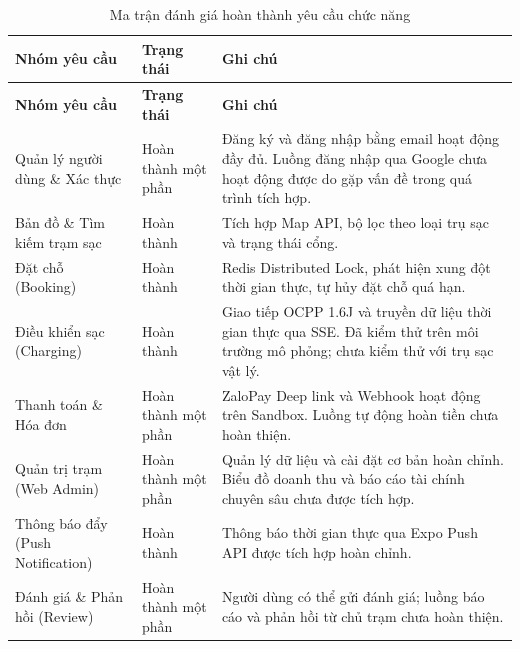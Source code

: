 \begin{center}
    \renewcommand{\arraystretch}{1.5}
    \begin{longtable}{|>{\raggedright\arraybackslash}m{}|>{\centering\arraybackslash}m{}|>{\raggedright\arraybackslash}m{}|}
        \caption{Ma trận đánh giá hoàn thành yêu cầu chức năng}
        \label{tab:func_eval} \\
        \hline
        \textbf{Nhóm yêu cầu} & \textbf{Trạng thái} & \textbf{Ghi chú} \\
        \hline
        \endfirsthead
        
        \hline
        \textbf{Nhóm yêu cầu} & \textbf{Trạng thái} & \textbf{Ghi chú} \\
        \hline
        \endhead
        
        Quản lý người dùng \& Xác thực & Hoàn thành một phần & Đăng ký và đăng nhập bằng email hoạt động đầy đủ. Luồng đăng nhập qua Google chưa hoạt động được do gặp vấn đề trong quá trình tích hợp. \\
        \hline
        Bản đồ \& Tìm kiếm trạm sạc & Hoàn thành & Tích hợp Map API, bộ lọc theo loại trụ sạc và trạng thái cổng. \\
        \hline
        Đặt chỗ (Booking) & Hoàn thành & Redis Distributed Lock, phát hiện xung đột thời gian thực, tự hủy đặt chỗ quá hạn. \\
        \hline
        Điều khiển sạc (Charging) & Hoàn thành & Giao tiếp OCPP 1.6J và truyền dữ liệu thời gian thực qua SSE. Đã kiểm thử trên môi trường mô phỏng; chưa kiểm thử với trụ sạc vật lý. \\
        \hline
        Thanh toán \& Hóa đơn & Hoàn thành một phần & ZaloPay Deep link và Webhook hoạt động trên Sandbox. Luồng tự động hoàn tiền chưa hoàn thiện. \\
        \hline
        Quản trị trạm (Web Admin) & Hoàn thành một phần & Quản lý dữ liệu và cài đặt cơ bản hoàn chỉnh. Biểu đồ doanh thu và báo cáo tài chính chuyên sâu chưa được tích hợp. \\
        \hline
        Thông báo đẩy (Push Notification) & Hoàn thành & Thông báo thời gian thực qua Expo Push API được tích hợp hoàn chỉnh. \\
        \hline
        Đánh giá \& Phản hồi (Review) & Hoàn thành một phần & Người dùng có thể gửi đánh giá; luồng báo cáo và phản hồi từ chủ trạm chưa hoàn thiện. \\
        \hline
    \end{longtable}
\end{center}

